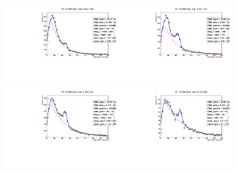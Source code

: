\begin{figure}[htb]
\begin{center}
   \includegraphics[width=0.45\textwidth]{../figs/figs_v11/ELECTRON_WGamma/EtoGammaFits/sa_hZmass_h_Data_EtoGamma_Enr_BARREL_pt15to20_ieta2_noWMtCut.pdf}\includegraphics[width=0.45\textwidth]{../figs/figs_v11/ELECTRON_WGamma/EtoGammaFits/sa_hZmass_h_Data_EtoGamma_Enr_BARREL_pt15to20_ieta3_noWMtCut.pdf}\\
   \includegraphics[width=0.45\textwidth]{../figs/figs_v11/ELECTRON_WGamma/EtoGammaFits/sa_hZmass_h_Data_EtoGamma_Enr_ENDCAP_pt15to20_ieta0_noWMtCut.pdf}\includegraphics[width=0.45\textwidth]{../figs/figs_v11/ELECTRON_WGamma/EtoGammaFits/sa_hZmass_h_Data_EtoGamma_Enr_ENDCAP_pt15to20_ieta1_noWMtCut.pdf}\\

\end{center}
\end{figure}
